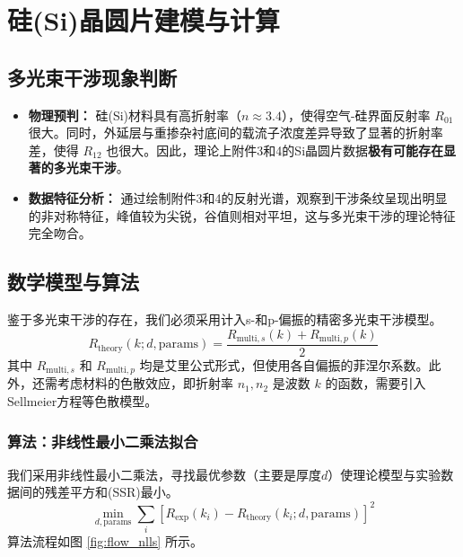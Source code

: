\documentclass[UTF8, 11pt]{ctexart}
\begin{document}
\section{硅(Si)晶圆片建模与计算}
\subsection{多光束干涉现象判断}
\begin{itemize}
    \item \textbf{物理预判：} 硅(Si)材料具有高折射率（$n \approx 3.4$），使得空气-硅界面反射率 $R_{01}$ 很大。同时，外延层与重掺杂衬底间的载流子浓度差异导致了显著的折射率差，使得 $R_{12}$ 也很大。因此，理论上附件3和4的Si晶圆片数据\textbf{极有可能存在显著的多光束干涉}。
    \item \textbf{数据特征分析：} 通过绘制附件3和4的反射光谱，观察到干涉条纹呈现出明显的非对称特征，峰值较为尖锐，谷值则相对平坦，这与多光束干涉的理论特征完全吻合。
\end{itemize}

\subsection{数学模型与算法}
鉴于多光束干涉的存在，我们必须采用计入s-和p-偏振的精密多光束干涉模型。
\begin{equation}
    R_{\text{theory}}(k; d, \text{params}) = \frac{R_{\text{multi}, s}(k) + R_{\text{multi}, p}(k)}{2}
\end{equation}
其中 $R_{\text{multi},s}$ 和 $R_{\text{multi},p}$ 均是艾里公式形式，但使用各自偏振的菲涅尔系数。此外，还需考虑材料的色散效应，即折射率 $n_1, n_2$ 是波数 $k$ 的函数，需要引入Sellmeier方程等色散模型。

\subsubsection{算法：非线性最小二乘法拟合}
我们采用非线性最小二乘法，寻找最优参数（主要是厚度$d$）使理论模型与实验数据间的残差平方和(SSR)最小。
\begin{equation}
    \min_{d, \text{params}} \sum_{i} \left[ R_{\text{exp}}(k_i) - R_{\text{theory}}(k_i; d, \text{params}) \right]^2
\end{equation}
算法流程如图 \ref{fig:flow_nlls} 所示。
\end{document}
